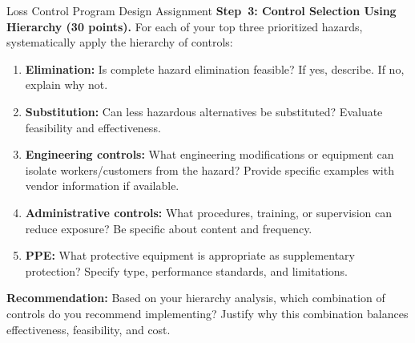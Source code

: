\documentclass[11pt,openany]{book}
\providecommand{\tightlist}{\setlength{\itemsep}{0pt}\setlength{\parskip}{0pt}}
\begin{document}
\begin{minicase}{Loss Control Program Design Assignment}
\medskip
\textbf{Step~3: Control Selection Using Hierarchy (30 points).} For each of
your top three prioritized hazards, systematically apply the hierarchy of
controls:
\begin{enumerate}\tightlist
  \item \textbf{Elimination:} Is complete hazard elimination feasible? If yes,
        describe. If no, explain why not.
  \item \textbf{Substitution:} Can less hazardous alternatives be substituted?
        Evaluate feasibility and effectiveness.
  \item \textbf{Engineering controls:} What engineering modifications or
        equipment can isolate workers/customers from the hazard? Provide
        specific examples with vendor information if available.
  \item \textbf{Administrative controls:} What procedures, training, or
        supervision can reduce exposure? Be specific about content and
        frequency.
  \item \textbf{PPE:} What protective equipment is appropriate as
        supplementary protection? Specify type, performance standards, and
        limitations.
\end{enumerate}
\textbf{Recommendation:} Based on your hierarchy analysis, which combination
of controls do you recommend implementing? Justify why this combination
balances effectiveness, feasibility, and cost.


\end{minicase}
\end{document}

